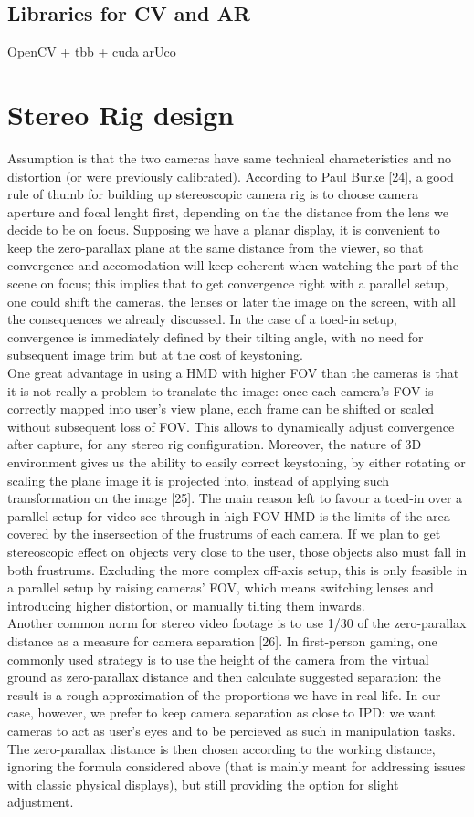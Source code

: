 \subsection{Libraries for CV and AR}
OpenCV + tbb + cuda
arUco
\fi

\section{Stereo Rig design}
Assumption is that the two cameras have same technical characteristics and no distortion (or were previously calibrated). According to Paul Burke [24], a good rule of thumb for building up stereoscopic camera rig is to choose camera aperture and focal lenght first, depending on the the distance from the lens we decide to be on focus. Supposing we have a planar display, it is convenient to keep the zero-parallax plane at the same distance from the viewer, so that convergence and accomodation will keep coherent when watching the part of the scene on focus; this implies that to get convergence right with a parallel setup, one could shift the cameras, the lenses or later the image on the screen, with all the consequences we already discussed. In the case of a toed-in setup, convergence is immediately defined by their tilting angle, with no need for subsequent image trim but at the cost of keystoning.\\
One great advantage in using a HMD with higher FOV than the cameras is that it is not really a problem to translate the image: once each camera's FOV is correctly mapped into user's view plane, each frame can be shifted or scaled without subsequent loss of FOV. This allows to dynamically adjust convergence after capture, for any stereo rig configuration. Moreover, the nature of 3D environment gives us the ability to easily correct keystoning, by either rotating or scaling the plane image it is projected into, instead of applying such transformation on the image [25]. The main reason left to favour a toed-in over a parallel setup for video see-through in high FOV HMD is the limits of the area covered by the insersection of the frustrums of each camera. If we plan to get stereoscopic effect on objects very close to the user, those objects also must fall in both frustrums. Excluding the more complex off-axis setup, this is only feasible in a parallel setup by raising cameras' FOV, which means switching lenses and introducing higher distortion, or manually tilting them inwards.\\
Another common norm for stereo video footage is to use 1/30 of the zero-parallax distance as a measure for camera separation [26]. In first-person gaming, one commonly used strategy is to use the height of the camera from the virtual ground as zero-parallax distance and then calculate suggested separation: the result is a rough approximation of the proportions we have in real life. In our case, however, we prefer to keep camera separation as close to IPD: we want cameras to act as user's eyes and to be percieved as such in manipulation tasks. The zero-parallax distance is then chosen according to the working distance, ignoring the formula considered above (that is mainly meant for addressing issues with classic physical displays), but still providing the option for slight adjustment.

